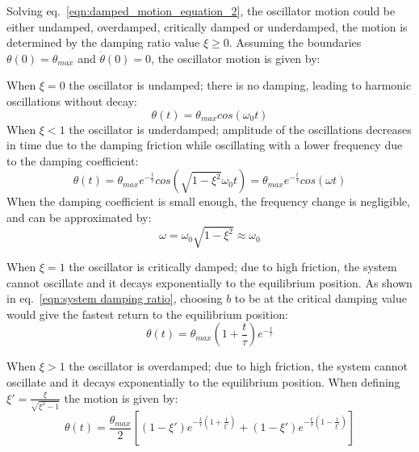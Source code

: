 \documentclass[\main/master.tex]{subfiles}
\begin{document}
\par\noindent
Solving eq.~\ref{eqn:damped_motion_equation_2}, the oscillator motion could be either undamped, overdamped, critically damped or underdamped, the motion is determined by the damping ratio value $\xi\geq 0$. Assuming the boundaries $\theta(0) = \theta_{max}$ and $\dot{\theta}(0) = 0$, the oscillator motion is given by:
\par\noindent
When $\xi = 0$ the oscillator is undamped; there is no damping, leading to harmonic oscillations without decay:
\begin{equation}
\theta(t) = \theta_{max}cos(\omega_0 t )    \label{eqn:undamped_motion_equation_2}
\end{equation}
When $\xi < 1$ the oscillator is underdamped; amplitude of the oscillations decreases in time due to the damping friction while oscillating with a lower frequency due to the damping coefficient: 
\begin{equation}
\theta(t) = \theta_{max} e^{-\frac{t}{\tau}}cos(\sqrt{1-\xi^2}\omega_0 t ) =  \theta_{max} e^{-\frac{t}{\tau}}cos(\omega t )    \label{eqn:underdamped_motion_equation}
\end{equation}
When the damping coefficient is small enough, the frequency change is negligible, and can be approximated by:
\begin{equation}
\omega = \omega_0\sqrt{1-\xi^2}\approx\omega_0    \label{eqn:underdamped_frequency}
\end{equation}
\par\noindent
When $\xi = 1$ the oscillator is critically damped; due to high friction, the system cannot oscillate and it decays exponentially to the equilibrium position. As shown in eq.~\ref{eqn:system damping ratio}, choosing $b$ to be at the critical damping value would give the fastest return to the equilibrium position:
\begin{equation}
\theta(t) = \theta_{max}(1+\frac{t}{\tau}) e^{-\frac{t}{\tau}}     \label{eqn:critically_damped_motion_equation}
\end{equation}
\par\noindent
When $\xi > 1$ the oscillator is overdamped; due to high friction, the system cannot oscillate and it decays exponentially to the equilibrium position. When defining $\xi'  = \frac{\xi}{\sqrt{\xi^2 - 1}}$ the motion is given by: 
\begin{equation}
\theta(t) = \frac{\theta_{max}}{2} [ (1-\xi')e^{-\frac{t}{\tau}(1+\frac{1}{\xi'})} +(1-\xi')e^{-\frac{t}{\tau}(1-\frac{1}{\xi'})} ]
\label{eqn:overdamped_motion_equation}
\end{equation}
\end{document}
